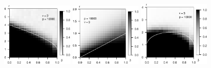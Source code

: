 \begin{figure}
	\includegraphics[width=0.32\textwidth]{figures/sim_strong_boundary/simulated_strong_boundary_chi-squared_nu3_p10000.eps}
    \includegraphics[width=0.32\textwidth]{figures/sim_weak_boundary/simulated_weak_boundary_chi-squared_nu3_p10000.eps}
    \includegraphics[width=0.32\textwidth]{figures/sim_approx-exact_boundary/simulated_approx-exact_boundary_chi-squared_nu3_p10000.eps}
	

\end{figure}
